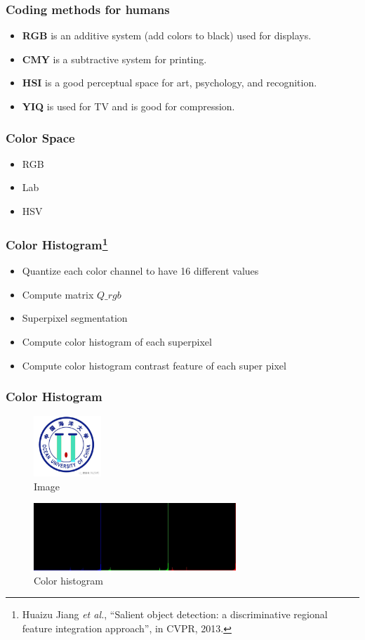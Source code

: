 \documentclass[notheorems,serif,table,compress]{beamer}  %
\begin{document}
\begin{frame}
\frametitle{Coding methods for humans}
\begin{itemize}
\item \textbf{RGB} is an additive system (add colors to black) used for displays.
\item \textbf{CMY} is a subtractive system for printing.
\item \textbf{HSI} is a good perceptual space for art, psychology, and recognition.
\item \textbf{YIQ} is used for TV and is good for compression. 
\end{itemize}
\end{frame}


\begin{frame}
\frametitle{Color Space}
\begin{itemize}
\item RGB
\item Lab
\item HSV
\end{itemize}
\end{frame}


\begin{frame}
\frametitle{Color Histogram\footnote{Huaizu Jiang \textit{et al.}, ``Salient object detection: a discriminative regional feature integration approach'', in CVPR, 2013.} }
\begin{itemize}
\item Quantize each color channel to have 16 different values
\item Compute matrix $Q\_rgb$
\item Superpixel segmentation
\item Compute color histogram of each superpixel
\item Compute color histogram contrast feature of each super pixel
\end{itemize}
\end{frame}

\begin{frame}
\frametitle{Color Histogram}
\begin{figure}
  \centering\includegraphics[width=1in]{1.jpg}
  \caption{Image}
 \label{1}
  \end{figure}

\begin{figure}
  \centering\includegraphics[width=3in]{RGBhist.jpg}
  \caption{Color histogram}
 \label{RGBhist}
  \end{figure}
\end{frame}
\end{document}
